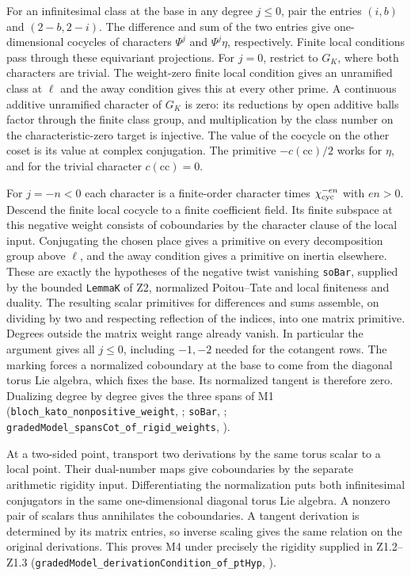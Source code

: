 For an infinitesimal class at the base in any degree $j\le0$,
pair the entries $(i,b)$ and $(2-b,2-i)$. The difference and sum
of the two entries give one-dimensional cocycles of characters
$\Psi^j$ and $\Psi^j\eta$, respectively. Finite local conditions
pass through these equivariant projections. For $j=0$, restrict to
$G_K$, where both characters are trivial. The weight-zero finite
local condition gives an unramified class at $\ell$ and the away
condition gives this at every other prime. A continuous additive
unramified character of $G_K$ is zero: its reductions by open additive
balls factor through the finite class group, and multiplication by the
class number on the characteristic-zero target is injective. The
value of the cocycle on the other coset is its value at complex
conjugation. The primitive $-c(\mathrm{cc})/2$ works for $\eta$,
and for the trivial character $c(\mathrm{cc})=0$.

For $j=-n<0$ each character is a finite-order character times
$\chi_{\rm cyc}^{-en}$ with $en>0$. Descend the finite local cocycle
to a finite coefficient field. Its finite subspace at this negative
weight consists of coboundaries by the character clause of the local
input. Conjugating the chosen place gives a primitive on every
decomposition group above $\ell$, and the away condition gives a primitive
on inertia elsewhere. These are exactly the hypotheses of the negative
twist vanishing \nolinkurl{soBar}, supplied by the bounded
\nolinkurl{LemmaK} of Z2, normalized Poitou--Tate and local
finiteness and duality. The resulting scalar primitives for differences
and sums assemble, on dividing by two and respecting reflection of
the indices, into one matrix primitive. Degrees outside the matrix
weight range already vanish. In particular the argument gives all
$j\le0$, including $-1,-2$ needed for the cotangent rows.
The marking forces a normalized coboundary at the base to come from
the diagonal torus Lie algebra, which fixes the base. Its normalized
tangent is therefore zero. Dualizing degree by degree gives the
three spans of M1
(\nolinkurl{bloch_kato_nonpositive_weight},
;
\nolinkurl{soBar}, ;
\nolinkurl{gradedModel_spansCot_of_rigid_weights},
).

At a two-sided point, transport two derivations by the same torus
scalar to a local point. Their dual-number maps give coboundaries
by the separate arithmetic rigidity input. Differentiating the
normalization puts both infinitesimal conjugators in the same
one-dimensional diagonal torus Lie algebra. A nonzero pair of
scalars thus annihilates the coboundaries. A tangent derivation is
determined by its matrix entries, so inverse scaling gives the same
relation on the original derivations. This proves M4 under precisely
the rigidity supplied in Z1.2--Z1.3
(\nolinkurl{gradedModel_derivationCondition_of_ptHyp},
).

